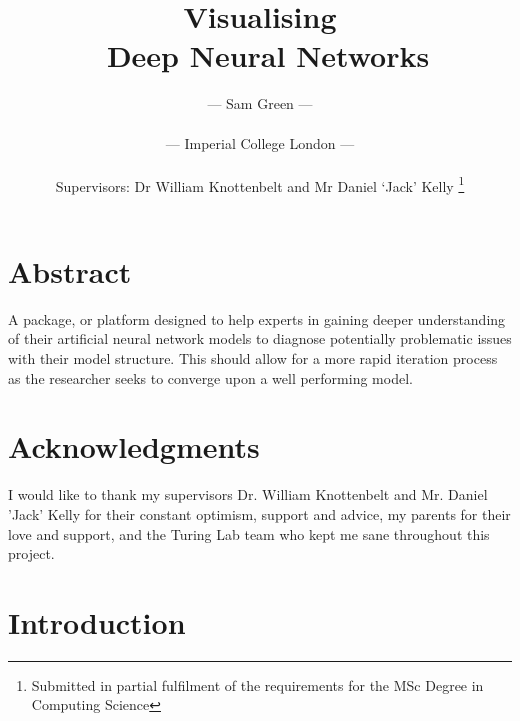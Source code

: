 \documentclass[a4paper,11pt,titlepage]{article}
\title{Visualising 
		\\\ Deep Neural Networks
		}
\author{
 \Large{--- Sam Green ---}
 \\
 \\
 \small{--- Imperial College London ---}
 \\
 \\
 \small{Supervisors: Dr William Knottenbelt and Mr Daniel `Jack' Kelly}
\thanks{Submitted in partial fulfilment of the requirements for the MSc Degree in Computing Science}
}
\begin{document}
\onehalfspacing

\maketitle

\clearpage
\clearpage

\section*{Abstract}
A package, or platform designed to help experts in gaining deeper understanding of their artificial neural network models to diagnose potentially problematic issues with their model structure. This should allow for a more rapid iteration process as the researcher seeks to converge upon a well performing model.
\clearpage

\section*{Acknowledgments}
I would like to thank my supervisors Dr. William Knottenbelt and Mr. Daniel 'Jack' Kelly for their constant optimism, support and advice, my parents for their love and support, and the Turing Lab team who kept me sane throughout this project.

\clearpage

\tableofcontents

\clearpage

\section{Introduction}
\end{document}
